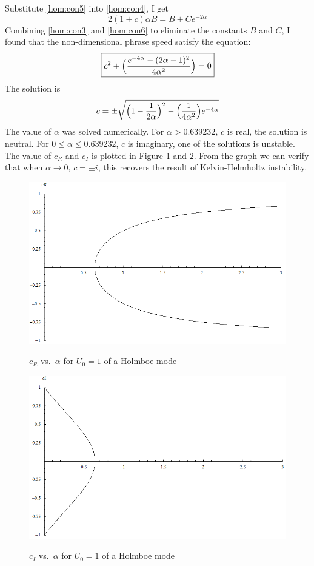 Substitute \eqref{hom:con5} into \eqref{hom:con4}, I get
\begin{equation}\label{hom:con6}
    2(1+c)\alpha B=B+Ce^{-2\alpha}
\end{equation}
\newslide
Combining \eqref{hom:con3} and \eqref{hom:con6} to eliminate the
constants $B$ and $C$, I found that the non-dimensional phrase speed
satisfy the equation:
\begin{equation}\label{hom:con}
    \boxed{c^2+\Bigl(\frac{e^{-4\alpha}-(2\alpha-1)^2}{4\alpha^2}\Bigr)=0}
\end{equation}
The solution is
\begin{equation}\label{hom:con7}
    c=\pm\sqrt{\Bigl(1-\frac{1}{2\alpha}\Bigr)^2-\Bigl(\frac{1}{4\alpha^2}\Bigr)e^{-4\alpha}}
\end{equation}
\newslide
The value of $\alpha$ was solved numerically. For $\alpha>0.639232$,
$c$ is real, the solution is neutral. For $0\leq\alpha\leq0.639232$,
$c$ is imaginary, one of the solutions is unstable. The value of
$c_R$ and $c_I$ is plotted in Figure \ref{ho1} and \ref{ho2}. From
the graph we can verify that when $\alpha \rightarrow 0$, $c=\pm i$,
this recovers the result of Kelvin-Helmholtz instability.
\begin{figure}[htpb]
  \centering
  \includegraphics[width=0.9\textheight]{ho1.png}\\
  \caption{$c_R$ vs.~$\alpha$ for $U_0=1$ of a Holmboe mode}\label{ho1}
\end{figure}
\begin{figure}[htpb]
  \centering
  \includegraphics[width=0.9\textheight]{ho2.png}\\
  \caption{$c_I$ vs.~$\alpha$ for $U_0=1$ of a Holmboe mode}\label{ho2}
\end{figure}
